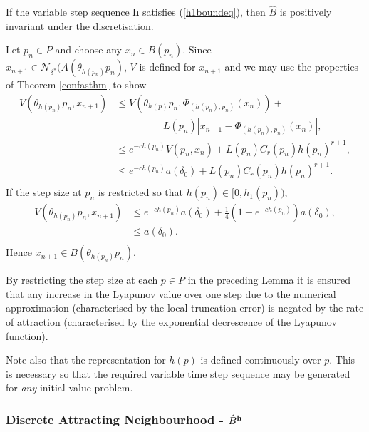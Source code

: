 \begin{lemma}[B2]
  If the variable step sequence {\bf h} satisfies (\ref{h1boundeq}), then
$\hat{B}$ is positively invariant under the discretisation.
\end{lemma}
\begin{prf}
  Let $p_n \in P$ and choose any $x_n \in B(p_n)$.
  Since \\
  $x_{n+1} \in \mathcal{N}_{\delta^*}(A(\theta_{h(p_n)}p_n)$,
  $V$ is defined for $x_{n+1}$ and
  we may use the properties of Theorem \ref{confasthm} to show
\begin{align*}
  V( \theta_{h(p_n)}p_n, x_{n+1} ) &\leq V( \theta_{h(p)}p_n, \Phi_{(h(p_n),
            p_n)}(x_n) ) + \\
  & \hspace{2cm} L(p_n)|x_{n+1} - \Phi_{(h(p_n), p_n)}(x_n)|, \\
  &\leq e^{-ch(p_n)} V( p_n, x_n ) + L(p_n)C_r(p_n)h(p_n)^{r+1}, \\
  &\leq e^{-ch(p_n)} a( \delta_0 ) + L(p_n)C_r(p_n)h(p_n)^{r+1}. \\
\end{align*}
If the step size at $p_n$ is restricted so that $h(p_n) \in [0,
h_1(p_n))$,
\begin{align*}
  V( \theta_{h(p_n)}p_n, x_{n+1} ) &\leq e^{-ch(p_n)} a( \delta_0 ) +
            \frac{1}{4}(1 - e^{-ch(p_n)}) a( \delta_0), \\
 &\leq a( \delta_0). \\
\end{align*}
Hence $x_{n+1} \in B(\theta_{h(p_n)}p_n)$.
\end{prf}

By restricting the step size at each $p \in P$ in the preceding
Lemma it is ensured that any increase in the Lyapunov value
over one step due to the numerical approximation (characterised by the local
truncation error) is negated by the rate of attraction (characterised by the
exponential decrescence of the Lyapunov function).

Note also that the representation for $h(p)$ is defined continuously over $p$.
This is necessary so that the required variable time step sequence
may be generated for \textit{any} initial value problem.

\subsubsection{Discrete Attracting Neighbourhood - $\hat{B}^{{\bf
        h}}$}

